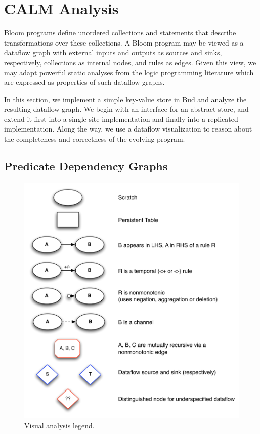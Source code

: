 \section{CALM Analysis}
Bloom programs define unordered collections and statements that describe
transformations over these collections.  A Bloom program may be viewed as a
dataflow graph with external inputs and outputs as sources and sinks,
respectively, collections as internal nodes, and rules as edges.  Given this
view, we may adapt powerful static analyses from the logic programming
literature which are expressed as properties of such dataflow graphs.

In this section, we implement a simple key-value store in Bud and analyze the
resulting dataflow graph.  We begin with an interface for an abstract store, and
extend it first into a single-site implementation and finally into a replicated implementation.
Along the way, we use a dataflow visualization to reason about the completeness
and correctness of the evolving program.


\subsection{Predicate Dependency Graphs}
\begin{figure}[t]
\centering
\includegraphics[width=0.9\linewidth]{fig/mittalk_legend.pdf}
\vspace{-10pt}
\caption{Visual analysis legend. }
\label{fig:analysis-legend}
\vspace{-2pt}
\end{figure}

